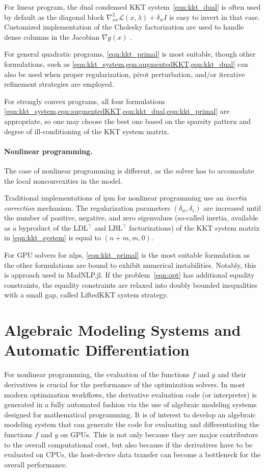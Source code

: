 \documentclass{article}
\begin{document}
For linear program, the dual condensed KKT system~\eqref{eqn:kkt_dual} is often used
by default as the diagonal block $\nabla^2_{x x} \mathcal{L}(x, \lambda) + \delta_w I$ is easy
to invert in that case. Customized implementation of the Cholesky factorization
are used to handle dense columns in the Jacobian $\nabla g(x)$ \cite{}.

For general quadratic programs, \cref{eqn:kkt_primal} is most suitable, though other formulations, such as \cref{eqn:kkt_system,eqn:augmentedKKT,eqn:kkt_dual} can also be used when proper regularization, pivot perturbation, and/or iterative refinement strategies are employed.

For strongly convex programs, all four formulations \cref{eqn:kkt_system,eqn:augmentedKKT,eqn:kkt_dual,eqn:kkt_primal} are appropriate, so one may choose the best one based on the sparsity pattern and degree of ill-conditioning of the KKT system matrix.


\paragraph{Nonlinear programming.}
The case of nonlinear programming is different, as the solver has to accomodate
the local nonconvexities in the model.

Traditional implementations of \gls{ipm} for nonlinear programming use an \emph{inertia correction} mechanism.
The regularization parameters $(\delta_w, \delta_c)$ are increased until the number of positive, negative, and zero eigenvalues (so-called inertia, available as a byproduct of the LDL$^\top$ and LBL$^\top$ factorizations) of the KKT system matrix in \eqref{eqn:kkt_system} is equal to $(n+m, m, 0)$.

For GPU solvers for \glspl*{nlp}, \cref{eqn:kkt_primal} is the most suitable formulation as the other formulations are bound to exhibit numerical instabilities.
Notably, this is approach used in MadNLP.jl.
If the problem~\eqref{eqn:opt} has additional equality constraints,
the equality constraints are relaxed into doubly bounded inequalities with a small gap, called LiftedKKT system strategy.




\section{Algebraic Modeling Systems and Automatic Differentiation}\label{eqn:ad}
For nonlinear programming, the evaluation of the functions $f$ and $g$ and their derivatives is crucial for the performance of the optimization solvers.
In most modern optimization workflows, the derivative evaluation code (or interpreter) is generated in a fully automated fashion via the use of algebraic modeling systems designed for mathematical programming.
It is of interest to develop an algebraic modeling system that can generate the code for evaluating and differentiating the functions $f$ and $g$ on GPUs.
This is not only because they are major contributors to the overall computational cost, but also because if the derivatives have to be evaluated on CPUs, the host-device data transfer can become a bottleneck for the overall performance.
\end{document}

